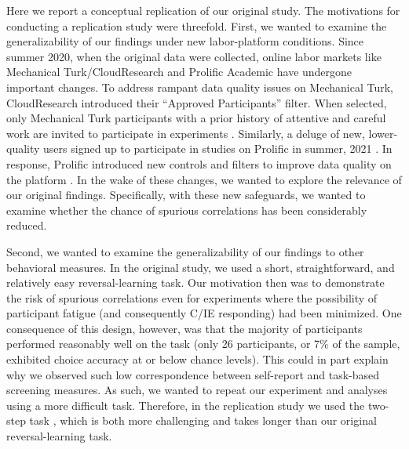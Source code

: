 \documentclass[a4paper,notitlepage,12pt]{article}
\begin{document}
Here we report a conceptual replication of our original study. The motivations for conducting a replication study were threefold. First, we wanted to examine the generalizability of our findings under new labor-platform conditions. Since summer 2020, when the original data were collected, online labor markets like Mechanical Turk/CloudResearch and Prolific Academic have undergone important changes. To address rampant data quality issues on Mechanical Turk, CloudResearch introduced their ``Approved Participants'' filter. When selected, only Mechanical Turk participants with a prior history of attentive and careful work are invited to participate in experiments \cite{cloudresearch_2020-2, hauser2021evaluating}. Similarly, a deluge of new, lower-quality users signed up to participate in studies on Prolific in summer, 2021 \cite{Letzter2021-bw}. In response, Prolific introduced new controls and filters to improve data quality on the platform \cite{prolific_2021}. In the wake of these changes, we wanted to explore the relevance of our original findings. Specifically, with these new safeguards, we wanted to examine whether the chance of spurious correlations has been considerably reduced. 

Second, we wanted to examine the generalizability of our findings to other behavioral measures. In the original study, we used a short, straightforward, and relatively easy reversal-learning task. Our motivation then was to demonstrate the risk of spurious correlations even for experiments where the possibility of participant fatigue (and consequently C/IE responding) had been minimized. One consequence of this design, however, was that the majority of participants performed reasonably well on the task (only 26 participants, or 7\% of the sample, exhibited choice accuracy at or below chance levels). This could in part explain why we observed such low correspondence between self-report and task-based screening measures. As such, we wanted to repeat our experiment and analyses using a more difficult task. Therefore, in the replication study we used the two-step task \cite{daw2011model}, which is both more challenging and takes longer than our original reversal-learning task. 
\end{document}
